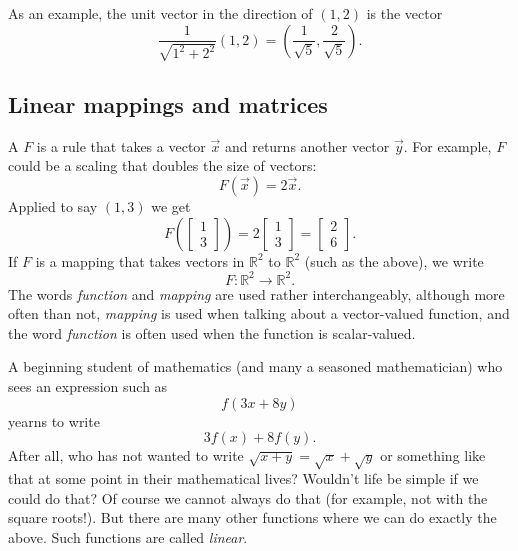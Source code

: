 As an example, the unit vector in the direction of $(1,2)$ is the vector
\begin{equation*}
\frac{1}{\sqrt{1^2+2^2}} (1,2)
=
\left( \frac{1}{\sqrt{5}}, \frac{2}{\sqrt{5}} \right) .
\end{equation*}

\subsection{Linear mappings and matrices}

A \emph{}
$F$ is a rule that takes a vector $\vec{x}$ and returns another vector
$\vec{y}$.  For example, $F$ could be a scaling that doubles the size of
vectors:
\begin{equation*}
F(\vec{x}) = 2 \vec{x} .
\end{equation*}
Applied to say $(1,3)$ we get
\begin{equation*}
F
\left( \begin{bmatrix} 1 \\ 3 \end{bmatrix} \right)
=
2
\begin{bmatrix} 1 \\ 3 \end{bmatrix}
=
\begin{bmatrix} 2 \\ 6 \end{bmatrix} .
\end{equation*}
If $F$ is a mapping that takes vectors in
${\mathbb R}^2$ to
${\mathbb R}^2$ (such as the above), we write
\begin{equation*}
F \colon {\mathbb R}^2 \to {\mathbb R}^2 .
\end{equation*}
The words \emph{function} and \emph{mapping} are used rather interchangeably,
although more often than not, \emph{mapping} is used when talking about a
vector-valued function, and the word \emph{function} is often used when the
function is scalar-valued.

A beginning student of mathematics (and many a seasoned mathematician)
who sees an expression such as
\begin{equation*}
f(3x+8y)
\end{equation*}
yearns to write
\begin{equation*}
3f(x)+8f(y) .
\end{equation*}
After all, who has not wanted to write $\sqrt{x+y} = \sqrt{x} + \sqrt{y}$ or
something like that at some point in their mathematical lives?
Wouldn't life be simple if we could do that?
Of course we cannot always do that (for example, not with the square
roots!).
But there are many other functions where
we can do exactly the above.  Such functions are called \emph{linear}.

